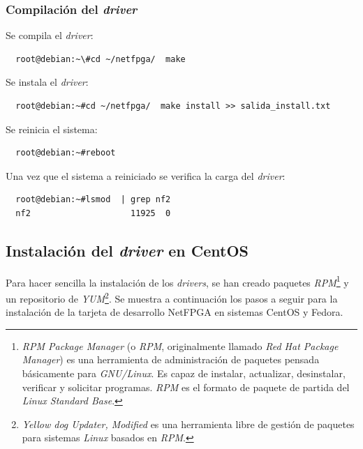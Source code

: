 \subsubsection{Compilación del \emph{driver}}

Se compila el \emph{driver}:

  \begin{verbatim}
  root@debian:~\#cd ~/netfpga/  make
  \end{verbatim}

Se instala el \emph{driver}:

  \begin{verbatim}
  root@debian:~#cd ~/netfpga/  make install >> salida_install.txt
  \end{verbatim}

Se reinicia el sistema:

  \begin{verbatim}
  root@debian:~#reboot
  \end{verbatim}

Una vez que el sistema a reiniciado se verifica la carga del \emph{driver}:

  \begin{verbatim}
  root@debian:~#lsmod  | grep nf2 
  nf2                    11925  0 
  \end{verbatim}


 \subsection{Instalación del \emph{driver} en CentOS }
  
Para hacer sencilla la instalación de los \emph{drivers}, se han creado 
paquetes \emph{RPM}\footnote{\emph{ RPM Package Manager} (o \emph{RPM},
originalmente llamado \emph{Red Hat Package Manager}) es una herramienta de
administración de paquetes pensada básicamente para \emph{GNU/Linux}. Es capaz
de instalar, actualizar, desinstalar, verificar y solicitar programas.
\emph{RPM} es el formato de paquete de partida del \emph{Linux Standard Base}.}
y un repositorio de \emph{YUM}\footnote{\emph{Yellow dog Updater, Modified} es
una herramienta libre de gestión de paquetes para sistemas \emph{Linux} basados
en \emph{RPM}.}. Se muestra a continuación los pasos a seguir para la
instalación de la tarjeta de desarrollo NetFPGA en sistemas CentOS y Fedora.

